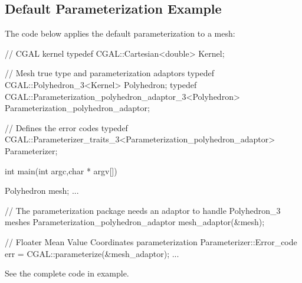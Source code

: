 \subsection{Default Parameterization Example}

The code below applies the default parameterization to a  mesh:

\begin{ccExampleCode}

// CGAL kernel
typedef CGAL::Cartesian<double>                         Kernel;

// Mesh true type and parameterization adaptors
typedef CGAL::Polyhedron_3<Kernel>                      Polyhedron;
typedef CGAL::Parameterization_polyhedron_adaptor_3<Polyhedron>         
                                                        Parameterization_polyhedron_adaptor;

// Defines the error codes
typedef CGAL::Parameterizer_traits_3<Parameterization_polyhedron_adaptor> 
                                                        Parameterizer;

int main(int argc,char * argv[])
{
    Polyhedron mesh;
    ...

    // The parameterization package needs an adaptor to handle Polyhedron_3 meshes
    Parameterization_polyhedron_adaptor mesh_adaptor(&mesh);

    // Floater Mean Value Coordinates parameterization
    Parameterizer::Error_code err = CGAL::parameterize(&mesh_adaptor);
    ...
}

\end{ccExampleCode}

See the complete code in  example.


